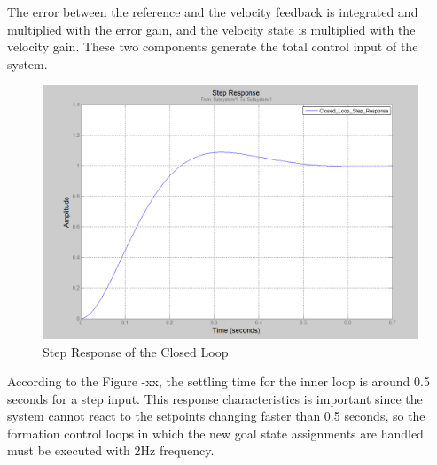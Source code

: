 The error between the reference and the velocity feedback is integrated and multiplied with the error gain, and the velocity state is multiplied with the velocity gain. These two components generate the total control input of the system.  

\begin{figure}[H]
\caption{Step Response of the Closed Loop}
\centering
\includegraphics[scale = 0.50]{step_resp}
\end{figure}

According to the Figure -xx, the settling time for the inner loop is around 0.5 seconds for a step input. This response characteristics is important since the system cannot react to the setpoints changing faster than 0.5 seconds, so the formation control loops in which the new goal state assignments are handled must be executed with 2Hz frequency.